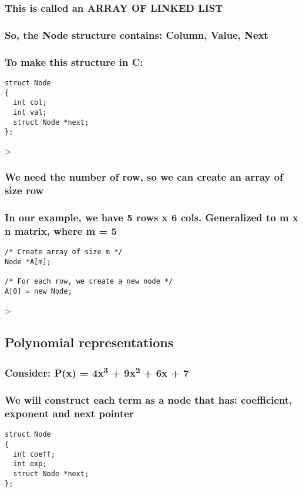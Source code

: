 \documentclass[11pt]{article}
\begin{document}
\subsubsection{This is called an \textbf{ARRAY OF LINKED LIST}}
\label{sec:org16903be}
\subsubsection{So, the Node structure contains: \textbf{Column}, \textbf{Value}, \textbf{Next}}
\label{sec:org412f958}
\subsubsection{To make this structure in C:}
\label{sec:orgaccd75b}
\begin{verbatim}
struct Node
{
  int col;
  int val;
  struct Node *next;
};
\end{verbatim}
>
\subsubsection{We need the number of row, so we can create an array of size row}
\label{sec:orge25f273}
\subsubsection{In our example, we have 5 rows x 6 cols. Generalized to m x n matrix, where \textbf{m = 5}}
\label{sec:org837e5a4}
\begin{verbatim}
/* Create array of size m */
Node *A[m];

/* For each row, we create a new node */
A[0] = new Node;
\end{verbatim}
>
\subsection{Polynomial representations}
\label{sec:org7567c28}
\subsubsection{Consider: P(x) = 4x\textsuperscript{3} + 9x\textsuperscript{2} + 6x + 7}
\label{sec:org3248fdd}
\subsubsection{We will construct each term as a node that has: coefficient, exponent and next pointer}
\label{sec:orgab3ab9e}
\begin{verbatim}
struct Node
{
  int coeff;
  int exp;
  struct Node *next;
};
\end{verbatim}
\end{document}

